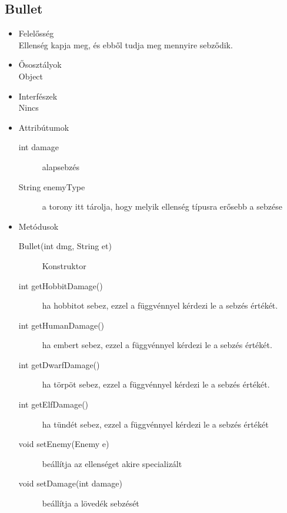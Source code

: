 \subsection{Bullet}
\begin{itemize}
\item Felelősség\\
Ellenség kapja meg, és ebből tudja meg mennyire sebződik.
\item Ősosztályok\\
Object
\item Interfészek\\
Nincs
\item Attribútumok\\
	\begin{description}
		\item[int damage] alapsebzés
		\item[String enemyType] a torony itt tárolja, hogy melyik ellenség típusra erősebb a sebzése
	\end{description}
\item Metódusok\\
	\begin{description}
		\item[Bullet(int dmg, String et)] Konstruktor
\item[int getHobbitDamage()] ha hobbitot sebez, ezzel a függvénnyel kérdezi le a sebzés értékét. 
\item[int getHumanDamage()] ha embert sebez, ezzel a függvénnyel kérdezi le a sebzés értékét.
\item[int getDwarfDamage()] ha törpöt sebez, ezzel a függvénnyel kérdezi le a sebzés értékét.
\item[int getElfDamage()] ha tündét sebez, ezzel a függvénnyel kérdezi le a sebzés értékét
\item[void setEnemy(Enemy e)] beállítja az ellenséget akire specializált
\item[void setDamage(int damage)] beállítja a lövedék sebzését

	\end{description}
\end{itemize}


